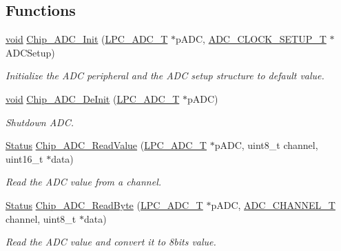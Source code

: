 \subsection*{Functions}
\begin{DoxyCompactItemize}
\item 
\hyperlink{Paradigm_2Tern__EE_2small_2portmacro_8h_a14d32f8130d3c0b212cfc751730b5b49}{void} \hyperlink{group__ADC__17XX__40XX_ga459b17621657a66281f2bc9baae3626c}{Chip\-\_\-\-A\-D\-C\-\_\-\-Init} (\hyperlink{structLPC__ADC__T}{L\-P\-C\-\_\-\-A\-D\-C\-\_\-\-T} $\ast$p\-A\-D\-C, \hyperlink{structADC__CLOCK__SETUP__T}{A\-D\-C\-\_\-\-C\-L\-O\-C\-K\-\_\-\-S\-E\-T\-U\-P\-\_\-\-T} $\ast$A\-D\-C\-Setup)
\begin{DoxyCompactList}\small\item\em Initialize the A\-D\-C peripheral and the A\-D\-C setup structure to default value. \end{DoxyCompactList}\item 
\hyperlink{Paradigm_2Tern__EE_2small_2portmacro_8h_a14d32f8130d3c0b212cfc751730b5b49}{void} \hyperlink{group__ADC__17XX__40XX_ga749cff51066bd49acaca0497d78f3332}{Chip\-\_\-\-A\-D\-C\-\_\-\-De\-Init} (\hyperlink{structLPC__ADC__T}{L\-P\-C\-\_\-\-A\-D\-C\-\_\-\-T} $\ast$p\-A\-D\-C)
\begin{DoxyCompactList}\small\item\em Shutdown A\-D\-C. \end{DoxyCompactList}\item 
\hyperlink{group__LPC__Types__Public__Types_ga67a0db04d321a74b7e7fcfd3f1a3f70b}{Status} \hyperlink{group__ADC__17XX__40XX_gab6374a3aa75b052970c472ee2e9f600e}{Chip\-\_\-\-A\-D\-C\-\_\-\-Read\-Value} (\hyperlink{structLPC__ADC__T}{L\-P\-C\-\_\-\-A\-D\-C\-\_\-\-T} $\ast$p\-A\-D\-C, uint8\-\_\-t channel, uint16\-\_\-t $\ast$data)
\begin{DoxyCompactList}\small\item\em Read the A\-D\-C value from a channel. \end{DoxyCompactList}\item 
\hyperlink{group__LPC__Types__Public__Types_ga67a0db04d321a74b7e7fcfd3f1a3f70b}{Status} \hyperlink{group__ADC__17XX__40XX_ga5dc774072fa55b145e57a25c1a146535}{Chip\-\_\-\-A\-D\-C\-\_\-\-Read\-Byte} (\hyperlink{structLPC__ADC__T}{L\-P\-C\-\_\-\-A\-D\-C\-\_\-\-T} $\ast$p\-A\-D\-C, \hyperlink{group__ADC__17XX__40XX_ga30ee7058bc7cc1daff718b29b42bed4e}{A\-D\-C\-\_\-\-C\-H\-A\-N\-N\-E\-L\-\_\-\-T} channel, uint8\-\_\-t $\ast$data)
\begin{DoxyCompactList}\small\item\em Read the A\-D\-C value and convert it to 8bits value. \end{DoxyCompactList}\item 

\end{DoxyCompactItemize}
